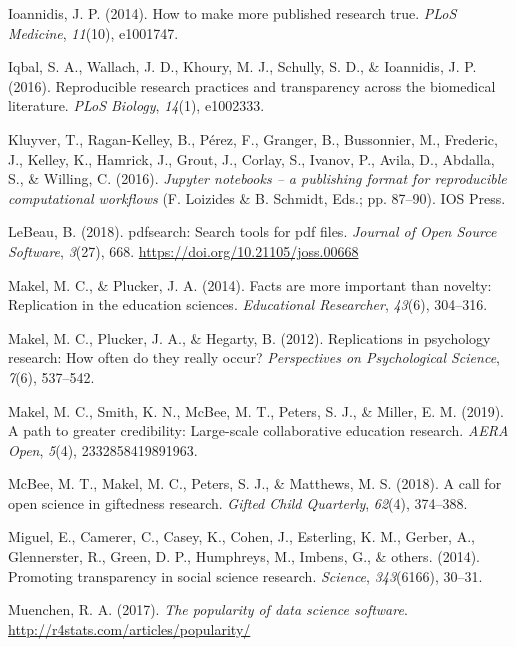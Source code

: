 \documentclass[
  english,
  ,man]{apa7}
\newlength{\cslhangindent}
\newenvironment{cslreferences}%
  {\setlength{\parindent}{0pt}%
  \everypar{\setlength{\hangindent}{\cslhangindent}}\ignorespaces}%
  {\par}
\begin{document}
\begin{cslreferences}
\leavevmode\hypertarget{ref-ioannidis2014}{}%
Ioannidis, J. P. (2014). How to make more published research true. \emph{PLoS Medicine}, \emph{11}(10), e1001747.

\leavevmode\hypertarget{ref-iqbal2016}{}%
Iqbal, S. A., Wallach, J. D., Khoury, M. J., Schully, S. D., \& Ioannidis, J. P. (2016). Reproducible research practices and transparency across the biomedical literature. \emph{PLoS Biology}, \emph{14}(1), e1002333.

\leavevmode\hypertarget{ref-kluyver2016}{}%
Kluyver, T., Ragan-Kelley, B., Pérez, F., Granger, B., Bussonnier, M., Frederic, J., Kelley, K., Hamrick, J., Grout, J., Corlay, S., Ivanov, P., Avila, D., Abdalla, S., \& Willing, C. (2016). \emph{Jupyter notebooks -- a publishing format for reproducible computational workflows} (F. Loizides \& B. Schmidt, Eds.; pp. 87--90). IOS Press.

\leavevmode\hypertarget{ref-pdfsearch}{}%
LeBeau, B. (2018). pdfsearch: Search tools for pdf files. \emph{Journal of Open Source Software}, \emph{3}(27), 668. \url{https://doi.org/10.21105/joss.00668}

\leavevmode\hypertarget{ref-makel2014}{}%
Makel, M. C., \& Plucker, J. A. (2014). Facts are more important than novelty: Replication in the education sciences. \emph{Educational Researcher}, \emph{43}(6), 304--316.

\leavevmode\hypertarget{ref-makel2012}{}%
Makel, M. C., Plucker, J. A., \& Hegarty, B. (2012). Replications in psychology research: How often do they really occur? \emph{Perspectives on Psychological Science}, \emph{7}(6), 537--542.

\leavevmode\hypertarget{ref-makel2019path}{}%
Makel, M. C., Smith, K. N., McBee, M. T., Peters, S. J., \& Miller, E. M. (2019). A path to greater credibility: Large-scale collaborative education research. \emph{AERA Open}, \emph{5}(4), 2332858419891963.

\leavevmode\hypertarget{ref-mcbee2018call}{}%
McBee, M. T., Makel, M. C., Peters, S. J., \& Matthews, M. S. (2018). A call for open science in giftedness research. \emph{Gifted Child Quarterly}, \emph{62}(4), 374--388.

\leavevmode\hypertarget{ref-miguel2014}{}%
Miguel, E., Camerer, C., Casey, K., Cohen, J., Esterling, K. M., Gerber, A., Glennerster, R., Green, D. P., Humphreys, M., Imbens, G., \& others. (2014). Promoting transparency in social science research. \emph{Science}, \emph{343}(6166), 30--31.

\leavevmode\hypertarget{ref-muenchen}{}%
Muenchen, R. A. (2017). \emph{The popularity of data science software}. \url{http://r4stats.com/articles/popularity/}


\end{cslreferences}
\end{document}
